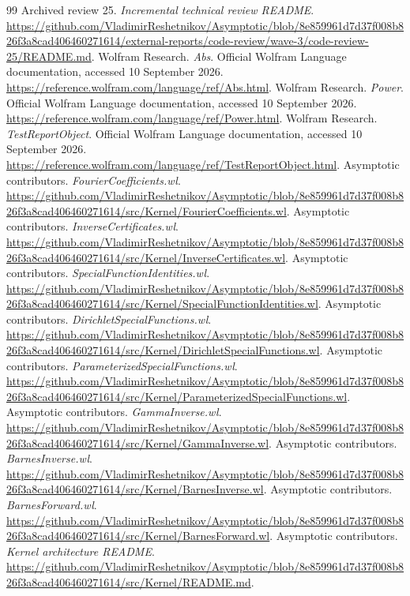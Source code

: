 \documentclass[11pt,letterpaper]{article}
\begin{document}
\begin{thebibliography}{99}
 Archived review 25. \emph{Incremental technical review README}. \url{https://github.com/VladimirReshetnikov/Asymptotic/blob/8e859961d7d37f008b826f3a8cad406460271614/external-reports/code-review/wave-3/code-review-25/README.md}.
 Wolfram Research. \emph{Abs}. Official Wolfram Language documentation, accessed 10 September 2026. \url{https://reference.wolfram.com/language/ref/Abs.html}.
 Wolfram Research. \emph{Power}. Official Wolfram Language documentation, accessed 10 September 2026. \url{https://reference.wolfram.com/language/ref/Power.html}.
 Wolfram Research. \emph{TestReportObject}. Official Wolfram Language documentation, accessed 10 September 2026. \url{https://reference.wolfram.com/language/ref/TestReportObject.html}.
 Asymptotic contributors. \emph{FourierCoefficients.wl}. \url{https://github.com/VladimirReshetnikov/Asymptotic/blob/8e859961d7d37f008b826f3a8cad406460271614/src/Kernel/FourierCoefficients.wl}.
 Asymptotic contributors. \emph{InverseCertificates.wl}. \url{https://github.com/VladimirReshetnikov/Asymptotic/blob/8e859961d7d37f008b826f3a8cad406460271614/src/Kernel/InverseCertificates.wl}.
 Asymptotic contributors. \emph{SpecialFunctionIdentities.wl}. \url{https://github.com/VladimirReshetnikov/Asymptotic/blob/8e859961d7d37f008b826f3a8cad406460271614/src/Kernel/SpecialFunctionIdentities.wl}.
 Asymptotic contributors. \emph{DirichletSpecialFunctions.wl}. \url{https://github.com/VladimirReshetnikov/Asymptotic/blob/8e859961d7d37f008b826f3a8cad406460271614/src/Kernel/DirichletSpecialFunctions.wl}.
 Asymptotic contributors. \emph{ParameterizedSpecialFunctions.wl}. \url{https://github.com/VladimirReshetnikov/Asymptotic/blob/8e859961d7d37f008b826f3a8cad406460271614/src/Kernel/ParameterizedSpecialFunctions.wl}.
 Asymptotic contributors. \emph{GammaInverse.wl}. \url{https://github.com/VladimirReshetnikov/Asymptotic/blob/8e859961d7d37f008b826f3a8cad406460271614/src/Kernel/GammaInverse.wl}.
 Asymptotic contributors. \emph{BarnesInverse.wl}. \url{https://github.com/VladimirReshetnikov/Asymptotic/blob/8e859961d7d37f008b826f3a8cad406460271614/src/Kernel/BarnesInverse.wl}.
 Asymptotic contributors. \emph{BarnesForward.wl}. \url{https://github.com/VladimirReshetnikov/Asymptotic/blob/8e859961d7d37f008b826f3a8cad406460271614/src/Kernel/BarnesForward.wl}.
 Asymptotic contributors. \emph{Kernel architecture README}. \url{https://github.com/VladimirReshetnikov/Asymptotic/blob/8e859961d7d37f008b826f3a8cad406460271614/src/Kernel/README.md}.
\end{thebibliography}
\end{document}
